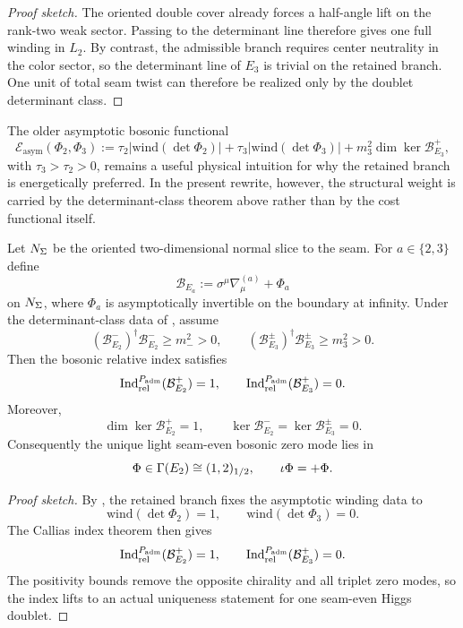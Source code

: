 \begin{proof}[Proof sketch]
The oriented double cover already forces a half-angle lift on the rank-two weak sector. Passing to the determinant line therefore gives one full winding in $L_2$. By contrast, the admissible branch requires center neutrality in the color sector, so the determinant line of $E_3$ is trivial on the retained branch. One unit of total seam twist can therefore be realized only by the doublet determinant class.
\end{proof}

\begin{remark}
The older asymptotic bosonic functional
\[
\mathcal E_{\mathrm{asym}}(\Phi_2,\Phi_3)
:=
\tau_2\bigl|\mathrm{wind}(\det\Phi_2)\bigr|
+\tau_3\bigl|\mathrm{wind}(\det\Phi_3)\bigr|
+m_3^2\dim\ker\mathcal B_{E_3}^+,
\]
with $\tau_3>\tau_2>0$, remains a useful physical intuition for why the retained branch is energetically preferred. In the present rewrite, however, the structural weight is carried by the determinant-class theorem above rather than by the cost functional itself.
\end{remark}

\begin{theorem}
\label{thm:callias-higgs-selection}
Let $N_\Sigma$ be the oriented two-dimensional normal slice to the seam. For $a\in\{2,3\}$ define
\[
\mathcal B_{E_a}:=\sigma^\mu\nabla^{(a)}_\mu+\Phi_a
\]
on $N_\Sigma$, where $\Phi_a$ is asymptotically invertible on the boundary at infinity. Under the determinant-class data of , assume
\[
(\mathcal B_{E_2}^-)^\dagger\mathcal B_{E_2}^-\ge m_-^2>0,
\qquad
(\mathcal B_{E_3}^{\pm})^\dagger\mathcal B_{E_3}^{\pm}\ge m_3^2>0.
\]
Then the bosonic relative index satisfies
\[
\operatorname{Ind}_{\mathrm{rel}}^{P_{\mathrm{adm}}}(\mathcal B_{E_2}^+)=1,
\qquad
\operatorname{Ind}_{\mathrm{rel}}^{P_{\mathrm{adm}}}(\mathcal B_{E_3}^+)=0.
\]
Moreover,
\[
\dim\ker\mathcal B_{E_2}^+=1,
\qquad
\ker\mathcal B_{E_2}^-=\ker\mathcal B_{E_3}^{\pm}=0.
\]
Consequently the unique light seam-even bosonic zero mode lies in
\[
\Phi\in\Gamma(E_2)\cong (1,2)_{1/2},
\qquad
\iota\Phi=+\Phi.
\]
\end{theorem}

\begin{proof}[Proof sketch]
By , the retained branch fixes the asymptotic winding data to
\[
\mathrm{wind}(\det\Phi_2)=1,
\qquad
\mathrm{wind}(\det\Phi_3)=0.
\]
The Callias index theorem then gives
\[
\operatorname{Ind}_{\mathrm{rel}}^{P_{\mathrm{adm}}}(\mathcal B_{E_2}^+)=1,
\qquad
\operatorname{Ind}_{\mathrm{rel}}^{P_{\mathrm{adm}}}(\mathcal B_{E_3}^+)=0.
\]
The positivity bounds remove the opposite chirality and all triplet zero modes, so the index lifts to an actual uniqueness statement for one seam-even Higgs doublet.
\end{proof}

